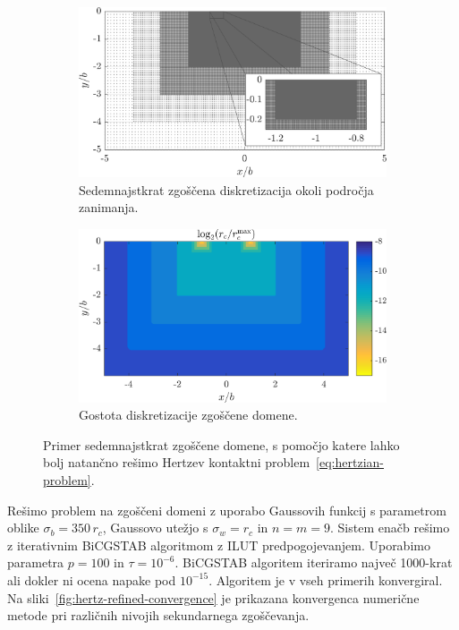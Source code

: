 \documentclass[12pt,a4paper,twoside]{article}
\theoremstyle{definition} %
\theoremstyle{plain} %
\numberwithin{equation}{section}
\begin{document}
\begin{figure}[h]
  \centering
  \begin{subfigure}[t]{0.45\textwidth}
    \includegraphics[width=\textwidth]{images/hertzian_refined_domain.png}
    \caption[Sedemnajstkrat zgoščena diskretizacija.]{Sedemnajstkrat zgoščena diskretizacija okoli področja zanimanja.}
    \label{fig:hertz-refined-domain}
  \end{subfigure}
  \begin{subfigure}[t]{0.45\textwidth}
    \includegraphics[width=\textwidth]{images/hertzian_refined_domain_density.png}
    \caption{Gostota diskretizacije zgoščene domene.}
    \label{fig:hertz-refined-domain-density}
  \end{subfigure}
  \caption[Primer zgoščene domene s katero rešujemo Hertzev kontaktni
  problem.]{Primer sedemnajstkrat zgoščene domene, s pomočjo katere lahko
  bolj natančno rešimo Hertzev kontaktni problem~\eqref{eq:hertzian-problem}.}
  \label{fig:hertz-refined-domain-together}
\end{figure}

Rešimo problem na zgoščeni domeni z uporabo Gaussovih funkcij s parametrom oblike $\sigma_b = 350\,
r_c$, Gaussovo utežjo s $\sigma_w = r_c$ in $n = m = 9$. Sistem enačb rešimo z iterativnim
BiCGSTAB algoritmom z ILUT predpogojevanjem. Uporabimo parametra $p=100$ in $\tau = 10^{-6}$.
BiCGSTAB algoritem iteriramo največ 1000-krat ali dokler ni ocena napake pod $10^{-15}$.
Algoritem je v vseh primerih konvergiral. Na sliki~\ref{fig:hertz-refined-convergence} je prikazana
konvergenca numerične metode pri različnih nivojih sekundarnega zgoščevanja.
\end{document}
